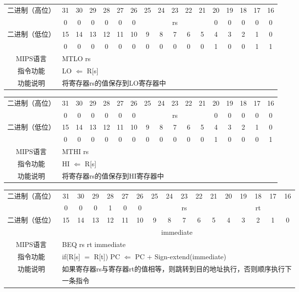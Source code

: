 \begin{table}
\begin{tabular}{|c|c|c|c|c|c|c|c|c|c|c|c|c|c|c|c|c|}
\hline
\multirow{2}{*}{二进制（高位）} &
31&30&29&28&27&26&25&24&23&22&21&20&19&18&17&16\\
\cline{2-17}
&
0&0&0&0&0&
0&
\multicolumn{5}{c|}{rs}&
0&0&0&0&0\\
\hline
\multirow{2}{*}{二进制（低位）} &
15&14&13&12&11&10&9&8&7&6&5&4&3&2&1&0\\
\cline{2-17}
&
0&0&0&0&0&
0&0&0&0&0&
0&1&0&0&1&
1\\
\hline
MIPS语言&
\multicolumn{16}{l|}{MTLO rs}\\
\hline
指令功能&
\multicolumn{16}{l|}{LO $\Leftarrow$ R[s]}\\
\hline
功能说明&
\multicolumn{16}{l|}{将寄存器rs的值保存到LO寄存器中}\\
\hline
\end{tabular}
\end{table}

\begin{table}
\begin{tabular}{|c|c|c|c|c|c|c|c|c|c|c|c|c|c|c|c|c|}
\hline
\multirow{2}{*}{二进制（高位）} &
31&30&29&28&27&26&25&24&23&22&21&20&19&18&17&16\\
\cline{2-17}
&
0&0&0&0&0&
0&
\multicolumn{5}{c|}{rs}&
0&0&0&0&0\\
\hline
\multirow{2}{*}{二进制（低位）} &
15&14&13&12&11&10&9&8&7&6&5&4&3&2&1&0\\
\cline{2-17}
&
0&0&0&0&0&
0&0&0&0&0&
0&1&0&0&0&
1\\
\hline
MIPS语言&
\multicolumn{16}{l|}{MTHI rs}\\
\hline
指令功能&
\multicolumn{16}{l|}{HI $\Leftarrow$ R[s]}\\
\hline
功能说明&
\multicolumn{16}{l|}{将寄存器rs的值保存到HI寄存器中}\\
\hline
\end{tabular}
\end{table}

\begin{table}
\begin{tabular}{|c|c|c|c|c|c|c|c|c|c|c|c|c|c|c|c|c|}
\hline
\multirow{2}{*}{二进制（高位）} &
31&30&29&28&27&26&25&24&23&22&21&20&19&18&17&16\\
\cline{2-17}
&
0&0&0&1&0&
0&
\multicolumn{5}{c|}{rs}&
\multicolumn{5}{c|}{rt}\\
\hline
\multirow{2}{*}{二进制（低位）} &
15&14&13&12&11&10&9&8&7&6&5&4&3&2&1&0\\
\cline{2-17}
&
\multicolumn{16}{c|}{immediate} \\
\hline
MIPS语言&
\multicolumn{16}{l|}{BEQ rs rt immediate}\\
\hline
指令功能&
\multicolumn{16}{l|}{if(R[s] $=$ R[t]) PC $\Leftarrow$ PC + Sign-extend(immediate)}\\
\hline
\multirow{2}{*}{功能说明} &
\multicolumn{16}{l|}{如果寄存器rs与寄存器rt的值相等，则跳转到目的地址执行，否则顺序执行下}\\
&\multicolumn{16}{l|}{一条指令}\\
\hline
\end{tabular}
\end{table}

